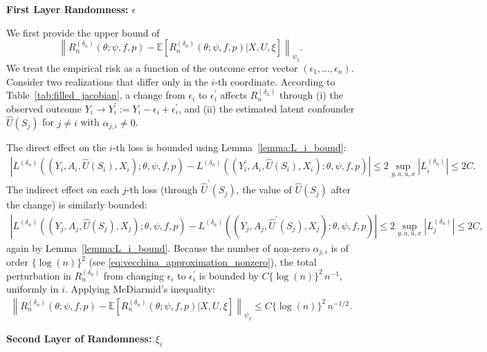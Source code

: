 \documentclass[12pt]{article}
\newcommand{\E}{\mathbb{E}}
\begin{document}
\noindent\textbf{First Layer Randomness: $\epsilon$}

\noindent We first provide the upper bound of
$$\left\|R_n^{(\delta_n)}(\theta;\psi,f,p)-\E\left[R_n^{(\delta_n)}(\theta;\psi,f,p)|X,U,\xi\right]\right\|_{\psi_2}.$$
We treat the empirical risk as a function of the outcome error vector $(\epsilon_1,\ldots,\epsilon_n)$. Consider two realizations that differ only in the $i$-th coordinate. According to Table~\ref{tab:filled_jacobian}, a change from $\epsilon_i$ to $\epsilon_i^\prime$ affects $R_n^{(\delta_n)}$ through (i) the observed outcome $Y_i\to Y_i^\prime:=Y_i-\epsilon_i+\epsilon_i^\prime$, and (ii) the estimated latent confounder $\widehat U(S_j)$ for $j\neq i$ with $\alpha_{j,i}\neq 0$.

The direct effect on the $i$-th loss is bounded using Lemma~\ref{lemma:L_i_bound}:
\begin{align*}
\left|L^{(\delta_n)}((Y_i,A_i,\widehat U(S_i),X_i);\theta,\psi,f,p) - L^{(\delta_n)}((Y_i^\prime,A_i,\widehat U(S_i),X_i);\theta,\psi,f,p)\right|
\leq 2\sup_{y,a,u,x}\left|L^{(\delta_n)}_i\right| \leq 2C.
\end{align*}
The indirect effect on each $j$-th loss (through $\widehat U^\prime(S_j)$, the value of $\widehat U(S_j)$ after the change) is similarly bounded:
\begin{align*}
\left|L^{(\delta_n)}((Y_j,A_j,\widehat U(S_j),X_j);\theta,\psi,f,p) - L^{(\delta_n)}((Y_j,A_j,\widehat U^\prime(S_j),X_j);\theta,\psi,f,p)\right|
\leq 2\sup_{y,a,u,x}\left|L^{(\delta_n)}_j\right| \leq 2C,
\end{align*}
again by Lemma~\ref{lemma:L_i_bound}. Because the number of non-zero $\alpha_{j,i}$ is of order $\{\log(n)\}^2$ (see \eqref{eq:vecchina_approximation_nonzero}), the total perturbation in $R_n^{(\delta_n)}$ from changing $\epsilon_i$ to $\epsilon_i^\prime$ is bounded by $C\{\log(n)\}^2\,n^{-1}$, uniformly in $i$. Applying McDiarmid's inequality:
\begin{align*}
\left\|R_n^{(\delta_n)}(\theta;\psi,f,p)-\E\left[R_n^{(\delta_n)}(\theta;\psi,f,p)|X,U,\xi\right]\right\|_{\psi_2}
\leq C\{\log(n)\}^2\,n^{-1/2}.
\end{align*}

\noindent\textbf{Second Layer of Randomness: $\xi_i$}
\end{document}
